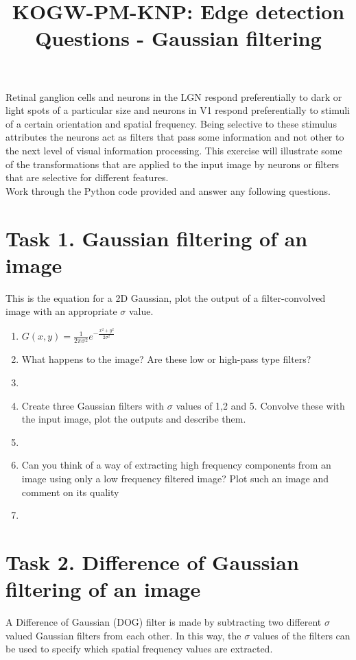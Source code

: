 \documentclass[12pt,english]{scrartcl}
\title{KOGW-PM-KNP: Edge detection Questions - Gaussian filtering}
\begin{document}
\maketitle
\raggedright
Retinal ganglion cells and neurons in the LGN respond preferentially to dark or light spots of a particular size and neurons in V1 respond preferentially to stimuli of a certain orientation and spatial frequency. Being selective to these stimulus attributes the neurons act as filters that pass some information and not other to the next level of visual information processing. This exercise will illustrate some of the transformations that are applied to the input image by neurons or filters that are selective for different features.\\
\bigskip
Work through the Python code provided and answer any following questions. 

\section*{Task 1. Gaussian filtering of an image}
 This is the equation for a 2D Gaussian, plot the output of a filter-convolved image with an appropriate $\sigma$ value.
 
\begin{enumerate}
 \item[]
 \centering
 $G(x,y) = \frac{1}{2\pi\sigma^2} e^{-\frac{x^2+y^2}{2\sigma^2}}$ \\
 \raggedright
 \item What happens to the image? Are these low or high-pass type filters? \\
 \item[]
 \color{black} 
 \item  Create three Gaussian filters with $\sigma$ values of 1,2 and 5. Convolve these with the input image, plot the outputs and describe them.\\
 \item[]
 \color{black}
 \item Can you think of a way of extracting high frequency components from an image using only a low frequency filtered image? Plot such an image and comment on its quality
 \item[]
 \end{enumerate}

\section*{Task 2. Difference of Gaussian filtering of an image}
A Difference of Gaussian (DOG) filter is made by subtracting two different $\sigma$ valued Gaussian filters from each other. In this way, the $\sigma$ values of the filters can be used to specify which spatial frequency values are extracted.
\end{document}
